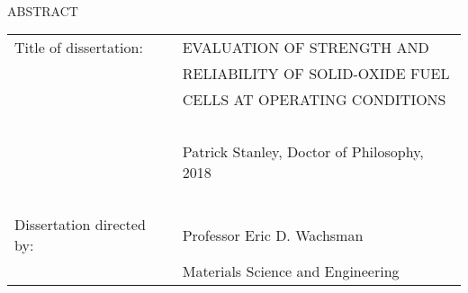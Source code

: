 

\hbox{\ }

\renewcommand{\baselinestretch}{1}
\small \normalsize

\begin{center}
\large{{ABSTRACT}}

\vspace{3em}

\end{center}
\hspace{-.15in}
\begin{tabular}{ll}
Title of dissertation:    & {\large  EVALUATION OF STRENGTH AND  }\\
&				      {\large  RELIABILITY OF SOLID-OXIDE FUEL } \\
&				      {\large  CELLS AT OPERATING CONDITIONS} \\
\ \\
&                          {\large  Patrick Stanley, Doctor of Philosophy, 2018} \\
\ \\
Dissertation directed by: & {\large  Professor Eric D. Wachsman} \\
&  				{\large	 Materials Science and Engineering } \\
\end{tabular}

\vspace{3em}

\renewcommand{\baselinestretch}{2}
\large \normalsize

\lipsum[1-4] %
